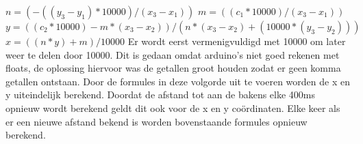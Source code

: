 \documentclass{article}
\begin{document}
\newline
\newline
$n =(-((y_3-y_1)*10000)/(x_3-x_1)) $
\newline
\newline
$m = ((c_1*10000)/(x_3-x_1)) $
\newline
\newline
$y = ((c_2*10000) - m*(x_3-x_2))/(n*(x_3-x_2) + (10000*(y_3-y_2))) $
\newline
\newline
$x = ((n*y)+m)/10000 $
\newline
\newline
Er wordt eerst vermenigvuldigd met 10000 om later weer te delen door 10000. Dit is gedaan omdat arduino's niet goed rekenen met floats, de oplossing hiervoor was de getallen groot houden zodat er geen komma getallen ontstaan. 
Door de formules in deze volgorde uit te voeren worden de x en y uiteindelijk berekend. Doordat de afstand tot aan de bakens elke 400ms opnieuw wordt berekend geldt dit ook voor de x en y co\"{o}rdinaten. Elke keer als er een nieuwe afstand bekend is worden bovenstaande formules opnieuw berekend. 
\end{document}
